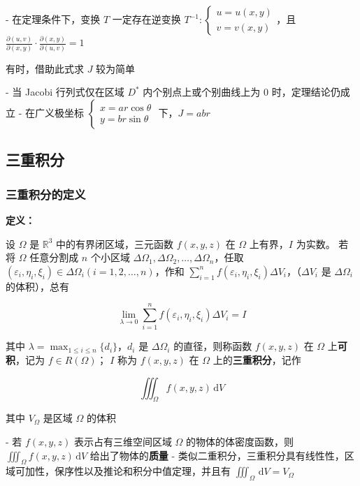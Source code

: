 \documentclass[lang = zh , final , oneside , openany , titlepage , zihao = -4 , linespread = 1.3 , baselineskip = false , cjk-font = windows , text-font = newtx , math-font = newtx]{sjtureport}
\begin{document}
- 在定理条件下，变换 \(T\) 一定存在逆变换 \(T^{-1}:\begin{cases}u = u(x,y)\\v = v(x,y)\end{cases}\)，且 \(\frac{\partial (u,v)}{\partial (x,y)}\cdot \frac{\partial (x,y)}{\partial (u,v)} = 1\)

  有时，借助此式求 \(J\) 较为简单

- 当 Jacobi 行列式仅在区域 \(D^*\) 内个别点上或个别曲线上为 \(0\) 时，定理结论仍成立
- 在广义极坐标 \(\begin{cases}x = ar\cos\theta\\y = br\sin\theta\end{cases}\) 下，\(J = abr\)

\subsection{三重积分}

\subsubsection{三重积分的定义}

\textbf{定义：}

设 \(\Omega\) 是 \(\mathbb{R}^3\) 中的有界闭区域，三元函数 \(f(x,y,z)\) 在 \(\Omega\) 上有界，\(I\) 为实数。 若将 \(\Omega\) 任意分割成 \(n\) 个小区域 \(\Delta \Omega_1,\Delta\Omega_2,\ldots,\Delta\Omega_n\)，任取 \((\varepsilon_i,\eta_i,\xi_i )\in\Delta\Omega_i\left(i = 1,2,\ldots,n\right)\)，作和 \(\sum_{i = 1}^n f(\varepsilon_i,\eta_i,\xi_i )\Delta V_i\)，（\(\Delta V_i\) 是 \(\Delta\Omega_i\) 的体积），总有

\[
\lim_{\lambda\to 0}\sum_{i = 1}^n f(\varepsilon_i,\eta_i,\xi_i )\Delta V_i = I
\]

其中 \(\lambda = \max_{1\leq i\leq n}\{d_i\}\)，\(d_i\) 是 \(\Delta\Omega_i\) 的直径，则称函数 \(f(x,y,z)\) 在 \(\Omega\) 上\textbf{可积}，记为 \(f\in R(\Omega)\)； \(I\) 称为 \(f(x,y,z)\) 在 \(\Omega\) 上的\textbf{三重积分}，记作

\[
\iiint_\Omega f(x,y,z)\,\mathrm{d}V
\]

其中 \(V_\Omega\) 是区域 \(\Omega\) 的体积

- 若 \(f(x,y,z)\) 表示占有三维空间区域 \(\Omega\) 的物体的体密度函数，则 \(\iiint_\Omega f(x,y,z)\,\mathrm{d}V\) 给出了物体的\textbf{质量}
- 类似二重积分，三重积分具有线性性，区域可加性，保序性以及推论和积分中值定理，并且有 \(\iiint_\Omega \,\mathrm{d}V = V_\Omega\)
\end{document}
